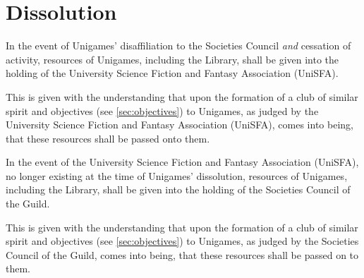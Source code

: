 \documentclass[a4paper]{article}
\begin{document}
\section{Dissolution} \label{sec:dissolution}
\begin{myEnumerate}
    \item In the event of Unigames' disaffiliation to the Societies Council \emph{and} cessation of activity, resources of Unigames, including the Library, shall be given into the holding of the University Science Fiction and Fantasy Association (UniSFA).
        \begin{myEnumerate}
            \item This is given with the understanding that upon the formation of a club of similar spirit and objectives (see \cref{sec:objectives}) to Unigames, as judged by the University Science Fiction and Fantasy Association (UniSFA), comes into being, that these resources shall be passed onto them.
        \end{myEnumerate}
    \item In the event of the University Science Fiction and Fantasy Association (UniSFA), no longer existing at the time of Unigames' dissolution, resources of Unigames, including the Library, shall be given into the holding of the Societies Council of the Guild.
        \begin{myEnumerate}
            \item This is given with the understanding that upon the formation of a club of similar spirit and objectives (see \cref{sec:objectives}) to Unigames, as judged by the Societies Council of the Guild, comes into being, that these resources shall be passed on to them.
        \end{myEnumerate}
\end{myEnumerate}
\end{document}
